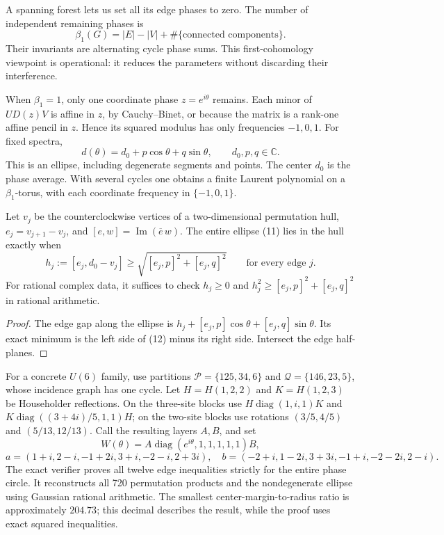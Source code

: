 \documentclass[11pt]{article}
\newcommand{\C}{\mathbb C}\newcommand{\R}{\mathbb R}\newcommand{\conv}{\operatorname{conv}}
\newcommand{\diag}{\operatorname{diag}}\newcommand{\Rea}{\operatorname{Re}}
\newcommand{\Ima}{\operatorname{Im}}\newcommand{\rank}{\operatorname{rank}}
\begin{document}
A spanning forest lets us set all its edge phases to zero. The number of independent remaining phases is
\[
\beta_1(G)=|E|-|V|+\#\{\text{connected components}\}.
\tag{10}
\]
Their invariants are alternating cycle phase sums. This first-cohomology viewpoint is operational: it reduces the parameters without discarding their interference.

When $\beta_1=1$, only one coordinate phase $z=e^{i\theta}$ remains. Each minor of $UD(z)V$ is affine in $z$, by Cauchy--Binet, or because the matrix is a rank-one affine pencil in $z$. Hence its squared modulus has only frequencies $-1,0,1$. For fixed spectra,
\[
d(\theta)=d_0+p\cos\theta+q\sin\theta,\qquad d_0,p,q\in\C.
\tag{11}
\]
This is an ellipse, including degenerate segments and points. The center $d_0$ is the phase average. With several cycles one obtains a finite Laurent polynomial on a $\beta_1$-torus, with each coordinate frequency in $\{-1,0,1\}$.

\begin{proposition}\label{ellipse}
Let $v_j$ be the counterclockwise vertices of a two-dimensional permutation hull, $e_j=v_{j+1}-v_j$, and $[e,w]=\Ima(\overline e\,w)$. The entire ellipse (11) lies in the hull exactly when
\[
h_j:=[e_j,d_0-v_j]\ge
\sqrt{[e_j,p]^2+[e_j,q]^2}\qquad\text{for every edge }j.
\tag{12}
\]
For rational complex data, it suffices to check
$h_j\ge0$ and $h_j^2\ge[e_j,p]^2+[e_j,q]^2$ in rational arithmetic.
\end{proposition}
\begin{proof}
The edge gap along the ellipse is $h_j+[e_j,p]\cos\theta+[e_j,q]\sin\theta$. Its exact minimum is the left side of (12) minus its right side. Intersect the edge half-planes.
\end{proof}

For a concrete $U(6)$ family, use partitions
$\mathcal P=\{125,34,6\}$ and $\mathcal Q=\{146,23,5\}$, whose incidence graph has one cycle. Let $H=H(1,2,2)$ and $K=H(1,2,3)$ be Householder reflections. On the three-site blocks use
$H\diag(1,i,1)K$ and $K\diag((3+4i)/5,1,1)H$; on the two-site blocks use rotations $(3/5,4/5)$ and $(5/13,12/13)$. Call the resulting layers $A,B$, and set
\[
W(\theta)=A\diag(e^{i\theta},1,1,1,1,1)B,
\]
\[
a=(1+i,2-i,-1+2i,3+i,-2-i,2+3i),\quad
b=(-2+i,1-2i,3+3i,-1+i,-2-2i,2-i).
\]
The exact verifier proves all twelve edge inequalities strictly for the entire phase circle. It reconstructs all 720 permutation products and the nondegenerate ellipse using Gaussian rational arithmetic. The smallest center-margin-to-radius ratio is approximately $204.73$; this decimal describes the result, while the proof uses exact squared inequalities.
\end{document}
